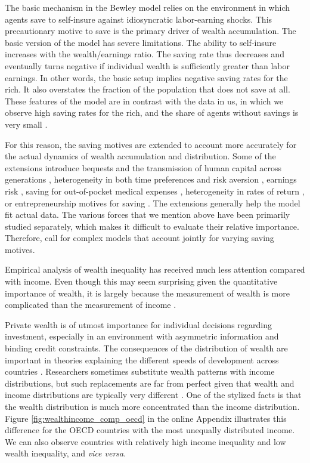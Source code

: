 \documentclass[a4paper,11pt]{article}
\begin{document}
The basic mechanism in the Bewley model relies on the environment in which agents save to self-insure against idiosyncratic labor-earning shocks. This precautionary motive to save is the primary driver of wealth accumulation. The basic version of the model has severe limitations. The ability to self-insure increases with the wealth/earnings ratio. The saving rate thus decreases and eventually turns negative if individual wealth is sufficiently greater than labor earnings. In other words, the basic setup implies negative saving rates for the rich. It also overstates the fraction of the population that does not save at all. These features of the model are in contrast with the data in \ac{us}, in which we observe high saving rates for the rich, and the share of agents without savings is very small \citep{DENARDI2017280}. 

For this reason, the saving motives are extended to account more accurately for the actual dynamics of wealth accumulation and distribution. Some of the extensions introduce bequests and the transmission of human capital across generations \citep{nardi2004wealth,de2014bequests}, heterogeneity in both time preferences and risk aversion \citep{HENDRICKS2007}, earnings risk \citep{castaneda2003}, saving for out-of-pocket medical expenses \citep{kopecky2014impact}, heterogeneity in rates of return \citep{lusardi2017optimal,BENHABIB2015489}, or entrepreneurship motives for saving \citep{cagetti2006entrepreneurship}. The extensions generally help the model fit actual data. The various forces that we mention above have been primarily studied separately, which makes it difficult to evaluate their relative importance. Therefore, \citet{DENARDI2017280} call for complex models that account jointly for varying saving motives.

Empirical analysis of wealth inequality has received much less attention compared with income. Even though this may seem surprising given the quantitative importance of wealth, it is largely because the measurement of wealth is more complicated than the measurement of income \citep{zucman2019}.

Private wealth is of utmost importance for individual  decisions regarding investment, especially in an environment with asymmetric information and binding credit constraints. The consequences of the distribution of wealth are important in theories explaining the different speeds of development across countries \citep{roine2015long}. Researchers sometimes substitute wealth patterns with income distributions, but such replacements are far from perfect given that wealth and income distributions are typically very different \citep{bagchi2015does}. One of the stylized facts is that the wealth distribution is much more concentrated than the income distribution. Figure \ref{fig:wealthincome_comp_oecd} in the online Appendix illustrates this difference for the OECD countries with the most unequally distributed income. We can also observe countries with relatively high income inequality and low wealth inequality, and \textit{vice versa}.
\end{document}
